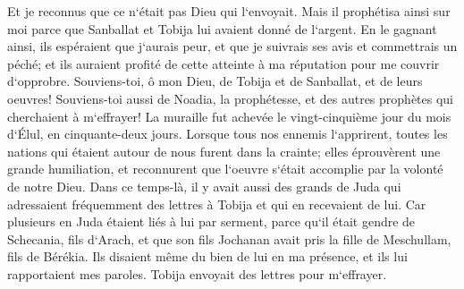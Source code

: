 \verse Et je reconnus que ce n`était pas Dieu qui l`envoyait. Mais il prophétisa ainsi sur moi parce que Sanballat et Tobija lui avaient donné de l`argent. 
\verse En le gagnant ainsi, ils espéraient que j`aurais peur, et que je suivrais ses avis et commettrais un péché; et ils auraient profité de cette atteinte à ma réputation pour me couvrir d`opprobre. 
\verse Souviens-toi, ô mon Dieu, de Tobija et de Sanballat, et de leurs oeuvres! Souviens-toi aussi de Noadia, la prophétesse, et des autres prophètes qui cherchaient à m`effrayer! 
\verse La muraille fut achevée le vingt-cinquième jour du mois d`Élul, en cinquante-deux jours. 
\verse Lorsque tous nos ennemis l`apprirent, toutes les nations qui étaient autour de nous furent dans la crainte; elles éprouvèrent une grande humiliation, et reconnurent que l`oeuvre s`était accomplie par la volonté de notre Dieu. 
\verse Dans ce temps-là, il y avait aussi des grands de Juda qui adressaient fréquemment des lettres à Tobija et qui en recevaient de lui. 
\verse Car plusieurs en Juda étaient liés à lui par serment, parce qu`il était gendre de Schecania, fils d`Arach, et que son fils Jochanan avait pris la fille de Meschullam, fils de Bérékia. 
\verse Ils disaient même du bien de lui en ma présence, et ils lui rapportaient mes paroles. Tobija envoyait des lettres pour m`effrayer. 

